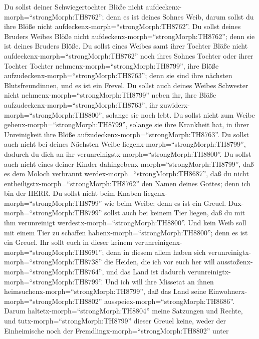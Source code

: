  Du sollst deiner Schwiegertochter Blöße nicht
aufdeckenx-morph=``strongMorph:TH8762''; denn es ist deines Sohnes Weib,
darum sollst du ihre Blöße nicht
aufdeckenx-morph=``strongMorph:TH8762''.  Du sollst deines
Bruders Weibes Blöße nicht aufdeckenx-morph=``strongMorph:TH8762''; denn
sie ist deines Bruders Blöße.  Du sollst eines Weibes samt
ihrer Tochter Blöße nicht aufdeckenx-morph=``strongMorph:TH8762'' noch
ihres Sohnes Tochter oder ihrer Tochter Tochter
nehmenx-morph=``strongMorph:TH8799'', ihre Blöße
aufzudeckenx-morph=``strongMorph:TH8763''; denn sie sind ihre nächsten
Blutsfreundinnen, und es ist ein Frevel.  Du sollst auch
deines Weibes Schwester nicht nehmenx-morph=``strongMorph:TH8799'' neben
ihr, ihre Blöße aufzudeckenx-morph=``strongMorph:TH8763'', ihr
zuwiderx-morph=``strongMorph:TH8800'', solange sie noch lebt.
 Du sollst nicht zum Weibe
gehenx-morph=``strongMorph:TH8799'', solange sie ihre Krankheit hat, in
ihrer Unreinigkeit ihre Blöße aufzudeckenx-morph=``strongMorph:TH8763''.
 Du sollst auch nicht bei deines Nächsten Weibe
liegenx-morph=``strongMorph:TH8799'', dadurch du dich an ihr
verunreinigstx-morph=``strongMorph:TH8800''.  Du sollst
auch nicht eines deiner Kinder dahingebenx-morph=``strongMorph:TH8799'',
daß es dem Moloch verbrannt werdex-morph=``strongMorph:TH8687'', daß du
nicht entheiligstx-morph=``strongMorph:TH8762'' den Namen deines Gottes;
denn ich bin der HERR.  Du sollst nicht beim Knaben
liegenx-morph=``strongMorph:TH8799'' wie beim Weibe; denn es ist ein
Greuel.  Dux-morph=``strongMorph:TH8799'' sollst auch bei
keinem Tier liegen, daß du mit ihm verunreinigt
werdestx-morph=``strongMorph:TH8800''. Und kein Weib soll mit einem Tier
zu schaffen habenx-morph=``strongMorph:TH8800''; denn es ist ein Greuel.
 Ihr sollt euch in dieser keinem
verunreinigenx-morph=``strongMorph:TH8691''; denn in diesem allem haben
sich verunreinigtx-morph=``strongMorph:TH8738'' die Heiden, die ich vor
euch her will ausstoßenx-morph=``strongMorph:TH8764'',  und
das Land ist dadurch verunreinigtx-morph=``strongMorph:TH8799''. Und ich
will ihre Missetat an ihnen heimsuchenx-morph=``strongMorph:TH8799'',
daß das Land seine Einwohnerx-morph=``strongMorph:TH8802''
ausspeiex-morph=``strongMorph:TH8686''.  Darum
haltetx-morph=``strongMorph:TH8804'' meine Satzungen und Rechte, und
tutx-morph=``strongMorph:TH8799'' dieser Greuel keine, weder der
Einheimische noch der Fremdlingx-morph=``strongMorph:TH8802'' unter
